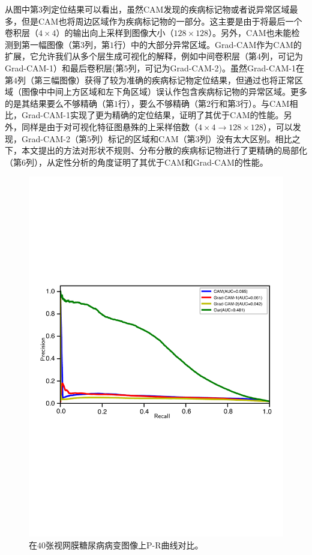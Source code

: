 从图中第$3$列定位结果可以看出，虽然CAM发现的疾病标记物或者说异常区域最多，但是CAM也将周边区域作为疾病标记物的一部分。这主要是由于将最后一个卷积层（$4\times 4$）的输出向上采样到图像大小（$128\times 128$）。另外，CAM也未能检测到第一幅图像（第$3$列，第$1$行）中的大部分异常区域。Grad-CAM作为CAM的扩展，它允许我们从多个层生成可视化的解释，例如中间卷积层（第$4$列，可记为Grad-CAM-1）和最后卷积层(第$5$列，可记为Grad-CAM-2)。虽然Grad-CAM-1在第$4$列（第三幅图像）获得了较为准确的疾病标记物定位结果，但通过也将正常区域（图像中中间上方区域和左下角区域）误认作包含疾病标记物的异常区域。更多的是其结果要么不够精确（第$1$行），要么不够精确（第$2$行和第$3$行）。与CAM相比，Grad-CAM-1实现了更为精确的定位结果，证明了其优于CAM的性能。另外，同样是由于对可视化特征图悬殊的上采样倍数（$4\times 4 \rightarrow 128\times 128$），可以发现，Grad-CAM-2（第$5$列）标记的区域和CAM（第$3$列）没有太大区别。相比之下，本文提出的方法对形状不规则、分布分散的疾病标记物进行了更精确的局部化（第$6$列），从定性分析的角度证明了其优于CAM和Grad-CAM的性能。
\begin{figure}[h!]
	\centering
	\includegraphics[width=1.0\textwidth]{figure/pr_curve_retinal_image/pr_curve}
	\caption[在$40$张视网膜糖尿病病变图像上P-R曲线对比]{在$40$张视网膜糖尿病病变图像上P-R曲线对比。}
	\label{fig:retinal_image_pr_curve}
\end{figure}


